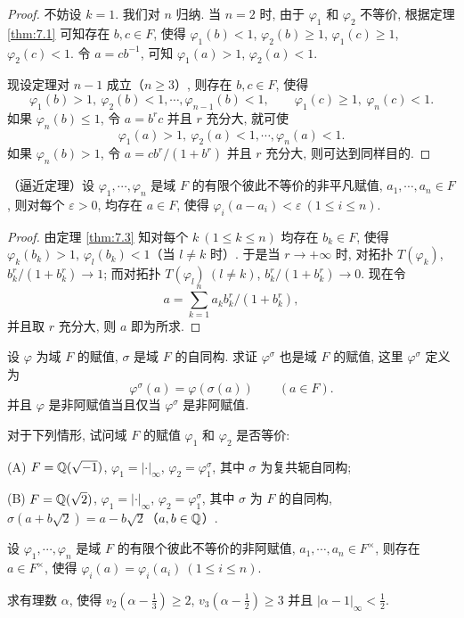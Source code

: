 \begin{proof}
不妨设 $k=1$. 我们对 $n$ 归纳. 当 $n=2$ 时, 由于 $\varphi_1$ 和 $\varphi_2$ 不等价, 根据定理 \ref{thm:7.1} 可知存在 $b,c\in F$, 使得 $\varphi_1(b)<1$, $\varphi_2(b)\geqslant 1$, $\varphi_1(c)\geqslant 1$, $\varphi_2(c)<1$. 令 $a=cb^{-1}$, 可知 $\varphi_1(a)>1$, $\varphi_2(a)<1$.

现设定理对 $n-1$ 成立（$n\geqslant 3$）, 则存在 $b,c\in F$, 使得
\[
  \varphi_1(b)>1,\ \varphi_2(b)<1,\cdots,\varphi_{n-1}(b)<1,\qquad
  \varphi_1(c)\geqslant 1,\ \varphi_n(c)<1.
\]
如果 $\varphi_n(b)\leqslant 1$, 令 $a=b^rc$ 并且 $r$ 充分大, 就可使
\[
  \varphi_1(a)>1,\ \varphi_2(a)<1,\cdots,\varphi_n(a)<1.
\]
如果 $\varphi_n(b)>1$, 令 $a=cb^r/(1+b^r)$ 并且 $r$ 充分大, 则可达到同样目的.
\end{proof}

\begin{theorem}\label{thm:7.4}
（逼近定理）设 $\varphi_1,\cdots,\varphi_n$ 是域 $F$ 的有限个彼此不等价的非平凡赋值, $a_1,\cdots,a_n\in F$, 则对每个 $\varepsilon>0$, 均存在 $a\in F$, 使得 $\varphi_i(a-a_i)<\varepsilon\ (1\leqslant i\leqslant n)$.
\end{theorem}

\begin{proof}
由定理 \ref{thm:7.3} 知对每个 $k\ (1\leqslant k\leqslant n)$ 均存在 $b_k\in F$, 使得 $\varphi_k(b_k)>1$, $\varphi_l(b_k)<1$（当 $l\neq k$ 时）. 于是当 $r\to+\infty$ 时, 对拓扑 $T(\varphi_k)$, $b_k^r/(1+b_k^r)\to 1$; 而对拓扑 $T(\varphi_l)\ (l\neq k)$, $b_k^r/(1+b_k^r)\to 0$. 现在令
\[
  a=\sum_{k=1}^{n}a_kb_k^r/(1+b_k^r),
\]
并且取 $r$ 充分大, 则 $a$ 即为所求.
\end{proof}

\begin{Exercises}
\item 设 $\varphi$ 为域 $F$ 的赋值, $\sigma$ 是域 $F$ 的自同构. 求证 $\varphi^{\sigma}$ 也是域 $F$ 的赋值, 这里 $\varphi^{\sigma}$ 定义为
\[
  \varphi^{\sigma}(a)=\varphi(\sigma(a))\qquad(a\in F).
\]
并且 $\varphi$ 是非阿赋值当且仅当 $\varphi^{\sigma}$ 是非阿赋值.

\item 对于下列情形, 试问域 $F$ 的赋值 $\varphi_1$ 和 $\varphi_2$ 是否等价:

(A) $F=\mathbb{Q}(\sqrt{-1})$, $\varphi_1=|\cdot|_{\infty}$, $\varphi_2=\varphi_1^{\sigma}$, 其中 $\sigma$ 为复共轭自同构;

(B) $F=\mathbb{Q}(\sqrt{2})$, $\varphi_1=|\cdot|_{\infty}$, $\varphi_2=\varphi_1^{\sigma}$, 其中 $\sigma$ 为 $F$ 的自同构, $\sigma(a+b\sqrt{2})=a-b\sqrt{2}$（$a,b\in\mathbb{Q}$）.

\item 设 $\varphi_1,\cdots,\varphi_n$ 是域 $F$ 的有限个彼此不等价的非阿赋值, $a_1,\cdots,a_n\in F^{\times}$, 则存在 $a\in F^{\times}$, 使得 $\varphi_i(a)=\varphi_i(a_i)\ (1\leqslant i\leqslant n)$.

\item 求有理数 $\alpha$, 使得 $v_2\left(\alpha-\frac{1}{3}\right)\geqslant 2$, $v_3\left(\alpha-\frac{1}{2}\right)\geqslant 3$ 并且 $\left|\alpha-1\right|_{\infty}<\frac{1}{2}$.
\end{Exercises}
